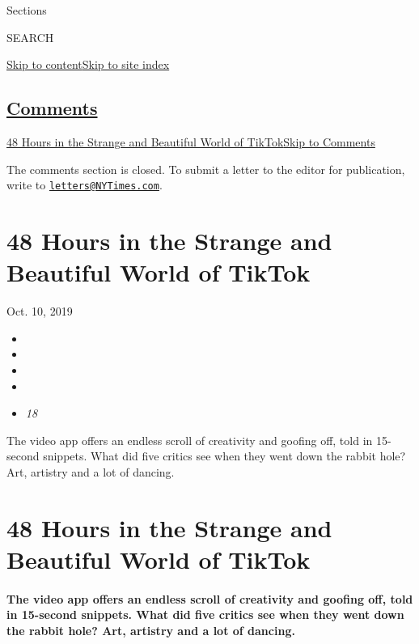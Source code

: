 Sections

SEARCH

\protect\hyperlink{site-content}{Skip to
content}\protect\hyperlink{site-index}{Skip to site index}

\hypertarget{comments}{%
\subsection{\texorpdfstring{\protect\hyperlink{commentsContainer}{Comments}}{Comments}}\label{comments}}

\href{}{48 Hours in the Strange and Beautiful World of
TikTok}\href{}{Skip to Comments}

The comments section is closed. To submit a letter to the editor for
publication, write to
\href{mailto:letters@NYTimes.com}{\nolinkurl{letters@NYTimes.com}}.

\hypertarget{48-hours-in-the-strange-and-beautiful-world-of-tiktok}{%
\section{48 Hours in the Strange and Beautiful World of
TikTok}\label{48-hours-in-the-strange-and-beautiful-world-of-tiktok}}

Oct. 10, 2019

\begin{itemize}
\item
\item
\item
\item
\item
  \emph{18}
\end{itemize}

The video app offers an endless scroll of creativity and goofing off,
told in 15-second snippets. What did five critics see when they went
down the rabbit hole? Art, artistry and a lot of dancing.

\hypertarget{48-hours-in-the-strange-and-beautiful-world-of-tiktok-1}{%
\section{48 Hours in the Strange and Beautiful World of
TikTok}\label{48-hours-in-the-strange-and-beautiful-world-of-tiktok-1}}

\hypertarget{the-video-app-offers-an-endless-scroll-of-creativity-and-goofing-off-told-in-15-second-snippets-what-did-five-critics-see-when-they-went-down-the-rabbit-hole-art-artistry-and-a-lot-of-dancing}{%
\paragraph{The video app offers an endless scroll of creativity and
goofing off, told in 15-second snippets. What did five critics see when
they went down the rabbit hole? Art, artistry and a lot of
dancing.}\label{the-video-app-offers-an-endless-scroll-of-creativity-and-goofing-off-told-in-15-second-snippets-what-did-five-critics-see-when-they-went-down-the-rabbit-hole-art-artistry-and-a-lot-of-dancing}}

